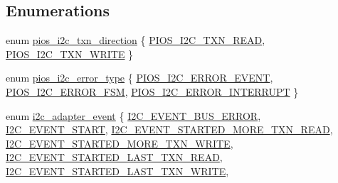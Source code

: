 \subsection*{\-Enumerations}
\begin{DoxyCompactItemize}
\item 
enum \hyperlink{group___p_i_o_s___i2_c_ga317e7ea68e21f759a0326df96f278a2b}{pios\-\_\-i2c\-\_\-txn\-\_\-direction} \{ \hyperlink{group___p_i_o_s___i2_c_gga317e7ea68e21f759a0326df96f278a2bad792429208f1a6cfeccea519a221c4c2}{\-P\-I\-O\-S\-\_\-\-I2\-C\-\_\-\-T\-X\-N\-\_\-\-R\-E\-A\-D}, 
\hyperlink{group___p_i_o_s___i2_c_gga317e7ea68e21f759a0326df96f278a2ba46f0bf6cbe98473562192f85efa6dfca}{\-P\-I\-O\-S\-\_\-\-I2\-C\-\_\-\-T\-X\-N\-\_\-\-W\-R\-I\-T\-E}
 \}
\item 
enum \hyperlink{group___p_i_o_s___i2_c_gace4c564ee87e97a12bf76c69b113b230}{pios\-\_\-i2c\-\_\-error\-\_\-type} \{ \hyperlink{group___p_i_o_s___i2_c_ggace4c564ee87e97a12bf76c69b113b230a7652a614c638dd5c4118f5fed79f5891}{\-P\-I\-O\-S\-\_\-\-I2\-C\-\_\-\-E\-R\-R\-O\-R\-\_\-\-E\-V\-E\-N\-T}, 
\hyperlink{group___p_i_o_s___i2_c_ggace4c564ee87e97a12bf76c69b113b230ad118dc6496d40c8ab841a5552d1e8502}{\-P\-I\-O\-S\-\_\-\-I2\-C\-\_\-\-E\-R\-R\-O\-R\-\_\-\-F\-S\-M}, 
\hyperlink{group___p_i_o_s___i2_c_ggace4c564ee87e97a12bf76c69b113b230a5c7272b41a6bc0595c2e7408233eefda}{\-P\-I\-O\-S\-\_\-\-I2\-C\-\_\-\-E\-R\-R\-O\-R\-\_\-\-I\-N\-T\-E\-R\-R\-U\-P\-T}
 \}
\item 
enum \hyperlink{group___p_i_o_s___i2_c_ga2a8f77797f5dbd873514e92d3d043649}{i2c\-\_\-adapter\-\_\-event} \{ \*
\hyperlink{group___p_i_o_s___i2_c_gga2a8f77797f5dbd873514e92d3d043649a8f6788d9ae0ccee581093112a2baa65c}{\-I2\-C\-\_\-\-E\-V\-E\-N\-T\-\_\-\-B\-U\-S\-\_\-\-E\-R\-R\-O\-R}, 
\hyperlink{group___p_i_o_s___i2_c_gga2a8f77797f5dbd873514e92d3d043649aef5af4537470d505c74d022cebc6366f}{\-I2\-C\-\_\-\-E\-V\-E\-N\-T\-\_\-\-S\-T\-A\-R\-T}, 
\hyperlink{group___p_i_o_s___i2_c_gga2a8f77797f5dbd873514e92d3d043649a3204e439e966796188a55b6be665b5d0}{\-I2\-C\-\_\-\-E\-V\-E\-N\-T\-\_\-\-S\-T\-A\-R\-T\-E\-D\-\_\-\-M\-O\-R\-E\-\_\-\-T\-X\-N\-\_\-\-R\-E\-A\-D}, 
\hyperlink{group___p_i_o_s___i2_c_gga2a8f77797f5dbd873514e92d3d043649a5d973e868fcb553ccbbd250602873bbe}{\-I2\-C\-\_\-\-E\-V\-E\-N\-T\-\_\-\-S\-T\-A\-R\-T\-E\-D\-\_\-\-M\-O\-R\-E\-\_\-\-T\-X\-N\-\_\-\-W\-R\-I\-T\-E}, 
\*
\hyperlink{group___p_i_o_s___i2_c_gga2a8f77797f5dbd873514e92d3d043649a84c9669600504225d7646363d92fe8fc}{\-I2\-C\-\_\-\-E\-V\-E\-N\-T\-\_\-\-S\-T\-A\-R\-T\-E\-D\-\_\-\-L\-A\-S\-T\-\_\-\-T\-X\-N\-\_\-\-R\-E\-A\-D}, 
\hyperlink{group___p_i_o_s___i2_c_gga2a8f77797f5dbd873514e92d3d043649ab0447b8f70b028bcb18f7e74c183aab2}{\-I2\-C\-\_\-\-E\-V\-E\-N\-T\-\_\-\-S\-T\-A\-R\-T\-E\-D\-\_\-\-L\-A\-S\-T\-\_\-\-T\-X\-N\-\_\-\-W\-R\-I\-T\-E}, 

\end{DoxyCompactItemize}
